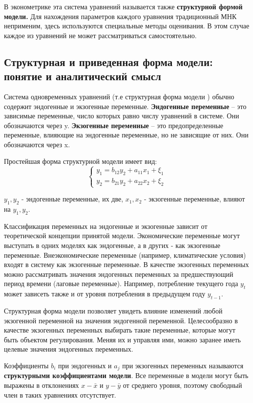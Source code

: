 \documentclass[aps,%
12pt,%
final,%
oneside,
onecolumn,%
musixtex, %
superscriptaddress,%
centertags]{article} %
\theoremstyle{plain}
\theoremstyle{definition}
\theoremstyle{remark}
\begin{document}
В эконометрике эта система уравнений называется также \textbf{структурной формой модели.} Для нахождения параметров каждого уравнения традиционный МНК неприменим, здесь используются специальные методы оценивания. В этом случае каждое из уравнений не может рассматриваться самостоятельно.


\newpage
\subsection{Структурная и приведенная форма модели: понятие и аналитический смысл}

Система одновременных уравнений (т.е структурная форма модели ) обычно содержит эндогенные и экзогенные переменные.
\textbf{Эндогенные переменные} – это зависимые переменные, число которых равно числу уравнений в системе. Они обозначаются через y.
\textbf{Экзогенные переменные} – это предопределенные переменные, влияющие на эндогенные переменные, но не зависящие от них. Они обозначаются через x.

Простейшая форма структурной модели имеет вид:
$$\left \{
\begin{matrix}
	y_1 = b_{12}y_2 + a_{11}x_1 + \xi_1\\
	y_2 = b_{21}y_2 + a_{22}x_2 + \xi_2
\end{matrix}
\right.
$$

$y_1,y_2$ - эндогенные переменные, их две,  $x_1,x_2$ - экзогенные переменные, влияют на $y_1, y_2$.

Классификация переменных на эндогенные и экзогенные зависит от теоретической концепции принятой модели. Экономические
переменные могут выступать в одних моделях как эндогенные, а в других - как экзогенные переменные. Внеэкономические переменные (например, климатические условия) входят в систему как экзогенные переменные. В качестве экзогенных переменных можно рассматривать значения эндогенных переменных за предшествующий период времени (лаговые переменные). Например, потребление текущего года $y_t$ может зависеть также и от уровня потребления в предыдущем году $y_{t-1}$.

Структурная форма модели позволяет увидеть влияние изменений любой экзогенной переменной на значения эндогенной переменной. Целесообразно в качестве экзогенных переменных выбирать такие переменные, которые могут быть объектом регулирования. Меняя их и управляя ими, можно заранее иметь целевые значения эндогенных переменных.

Коэффициенты $b_i$ при эндогенных и $a_j$ при экзогенных переменных называются \textbf{структурными коэффициентами модели}. Все переменные в модели могут быть выражены в отклонениях $x-\bar{x}$ и $y-\bar{y}$ от среднего уровня, поэтому свободный член в таких уравнениях отсутствует.
\end{document}
